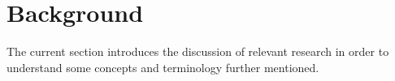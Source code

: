 \section{Background}
\label{sec:background}

The current section introduces the discussion of relevant research in order to understand some concepts and terminology further mentioned.




